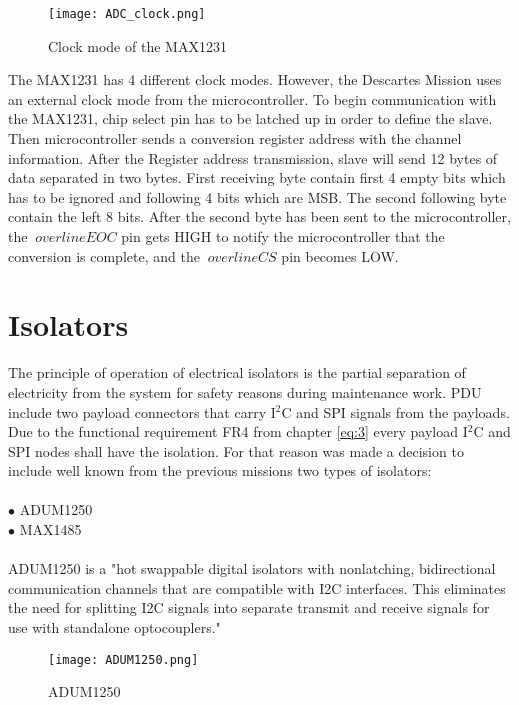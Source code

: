   \begin{figure}[h]
  	\centering
  	\texttt{[image: ADC\_clock.png]}
  	\caption{Clock mode of the MAX1231 \cite{25}}
  	\label{fig: adc}
  \end{figure} 
 
 The MAX1231 has 4 different clock modes. However, the Descartes Mission uses an external clock mode from the microcontroller.  To begin communication with the MAX1231, chip select pin has to be latched up in order to define the slave. Then microcontroller sends a conversion register address with the channel information. After the Register address transmission, slave will send 12 bytes of data separated in two bytes. First receiving byte contain first 4 empty bits which has to be ignored and following 4 bits which are MSB. The second following byte contain the left 8 bits. After the second byte has been sent to the microcontroller, the $ \ overline {EOC} $ pin gets HIGH to notify the microcontroller that the conversion is complete, and the $ \ overline {CS} $ pin becomes LOW.
 
 \section{Isolators}
 
The principle of operation of electrical isolators is the partial separation of electricity from the system for safety reasons during maintenance work. PDU include two payload connectors that carry I$^2$C and SPI signals from the payloads. Due to the functional requirement FR4 from chapter \ref{eq:3} every payload I$^2$C and SPI nodes shall have the isolation. For that reason was made a decision to include well known from the previous missions two types of isolators:\\ \\

$\bullet$ ADUM1250\\
$\bullet$ MAX1485\\ \\

ADUM1250 \cite{30} is a "hot swappable digital isolators with nonlatching, bidirectional communication channels that are compatible with I2C interfaces. This eliminates the need for splitting I2C signals into separate transmit and receive signals for use with standalone optocouplers."

 \begin{figure}[h]
 	\centering
 	\texttt{[image: ADUM1250.png]}
 	\caption{ADUM1250}
 	\label{fig: adum}
 \end{figure} 

